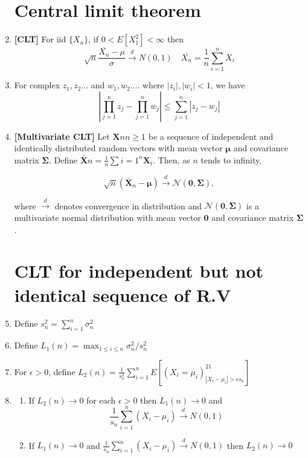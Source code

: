 \documentclass[12pt,oneside]{book}
\begin{document}
\begin{enumerate}
\section{Central limit theorem}
\item\textbf{[CLT]} For iid $\{X_n\}$, if $0<E[X_1^2]<\infty$ then $$\sqrt n\frac{\overline{X_n}-\mu}{\sigma}\xrightarrow[]{d}N(0,1)\quad \overline{X_n}=\frac{1}{n}\sum_{i=1}^nX_i$$
\item For complex $z_1,z_2...$ and $w_1,w_2....$ where $|z_i|,|w_i|<1$, we have $$\left|\prod_{j=1}^nz_j-\prod_{j=1}^nw_j\right|\leq\sum_{j=1}^n|z_j-w_j|$$

\item \textbf{[Multivariate CLT]} Let ${\mathbf{X}n}{n\geq 1}$ be a sequence of independent and identically distributed random vectors with mean vector $\boldsymbol{\mu}$ and covariance matrix $\boldsymbol{\Sigma}$. Define $\mathbf{\bar{X}}n = \frac{1}{n} \sum{i=1}^n \mathbf{X}_i$. Then, as $n$ tends to infinity,

\begin{equation*}
\sqrt{n}(\mathbf{\bar{X}}_n - \boldsymbol{\mu}) \xrightarrow{d} \mathcal{N}(\mathbf{0},\boldsymbol{\Sigma}),
\end{equation*}

where $\xrightarrow{d}$ denotes convergence in distribution and $\mathcal{N}(\mathbf{0},\boldsymbol{\Sigma})$ is a multivariate normal distribution with mean vector $\mathbf{0}$ and covariance matrix $\boldsymbol{\Sigma}$.


\section{CLT for independent but not identical sequence of R.V}
\item Define $s_n^2=\sum_{i=1}^n\sigma_n^2$
\item Define $L_1(n)=\max_{1\leq i\leq n}\sigma_n^2/s_n^2$
\item For $\epsilon>0$, define $L_2(n)=\frac{1}{s_n^2}\sum_{i=1}^nE[(X_i=\mu_i)^21_{|X_i-\mu_i|>\epsilon s_n}]$
\item \begin{enumerate}
    \item If $L_2(n)\to 0$ for each $\epsilon>0$ then $L_1(n)\to 0$ and 
    $$\frac{1}{s_n}\sum_{i=1}^n (X_i-\mu_i)\xrightarrow{d}N(0,1) $$
    \item If $L_1(n)\to 0$ and $\frac{1}{s_n}\sum_{i=1}^n (X_i-\mu_i)\xrightarrow{d}N(0,1) $ then $L_2(n)\to 0$
\end{enumerate}





\end{enumerate}
\end{document}
